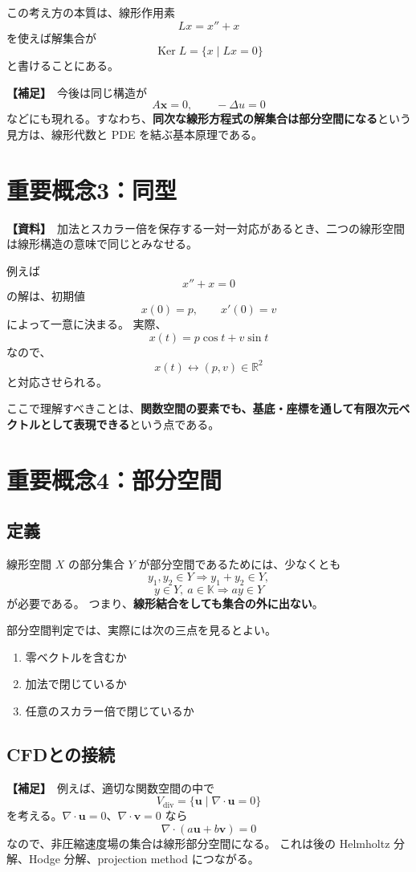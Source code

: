 \documentclass[a4paper,11pt]{ltjsarticle}
\newcommand{\R}{\mathbb{R}}
\newcommand{\K}{\mathbb{K}}
\newcommand{\Ker}{\operatorname{Ker}}
\newcommand{\sourceitem}{\textbf{【資料】}}
\newcommand{\suppitem}{\textbf{【補足】}}
\begin{document}
この考え方の本質は、線形作用素
\[
Lx=x''+x
\]
を使えば解集合が
\[
\Ker L=\{x\mid Lx=0\}
\]
と書けることにある。

\suppitem\ 今後は同じ構造が
\[
A\bm{x}=0,
\qquad
-\Delta u=0
\]
などにも現れる。すなわち、\textbf{同次な線形方程式の解集合は部分空間になる}という見方は、線形代数と PDE を結ぶ基本原理である。

\section{重要概念3：同型}

\sourceitem\ 加法とスカラー倍を保存する一対一対応があるとき、二つの線形空間は線形構造の意味で同じとみなせる。

例えば
\[
x''+x=0
\]
の解は、初期値
\[
x(0)=p,\qquad x'(0)=v
\]
によって一意に決まる。
実際、
\[
x(t)=p\cos t+v\sin t
\]
なので、
\[
x(t)\longleftrightarrow (p,v)\in\R^2
\]
と対応させられる。

ここで理解すべきことは、\textbf{関数空間の要素でも、基底・座標を通して有限次元ベクトルとして表現できる}という点である。

\section{重要概念4：部分空間}

\subsection{定義}
線形空間 $X$ の部分集合 $Y$ が部分空間であるためには、少なくとも
\[
y_1,y_2\in Y \Rightarrow y_1+y_2\in Y,
\]
\[
y\in Y,\ a\in\K \Rightarrow ay\in Y
\]
が必要である。
つまり、\textbf{線形結合をしても集合の外に出ない}。

部分空間判定では、実際には次の三点を見るとよい。
\begin{enumerate}
  \item 零ベクトルを含むか
  \item 加法で閉じているか
  \item 任意のスカラー倍で閉じているか
\end{enumerate}

\subsection{CFDとの接続}
\suppitem\ 例えば、適切な関数空間の中で
\[
V_{\mathrm{div}}
=
\{\bm{u}\mid \nabla\cdot\bm{u}=0\}
\]
を考える。$\nabla\cdot\bm{u}=0$、$\nabla\cdot\bm{v}=0$ なら
\[
\nabla\cdot(a\bm{u}+b\bm{v})=0
\]
なので、非圧縮速度場の集合は線形部分空間になる。
これは後の Helmholtz 分解、Hodge 分解、projection method につながる。
\end{document}

